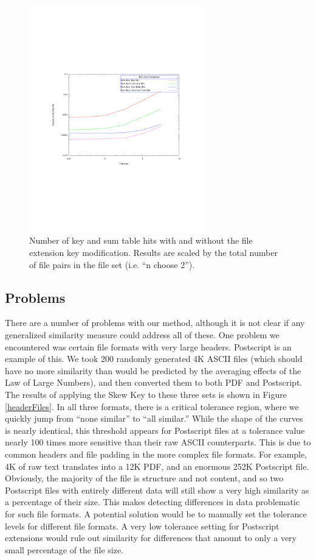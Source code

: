 \documentclass[10pt, twocolumn]{article}
\begin{document}
 \begin{figure}[t] 
 \centering
\includegraphics[width= 3in]{PairwiseElim.pdf}
\caption{Number of key and sum table hits with and without the file extension key modification.  Results are scaled by the total number of file pairs in the file set (i.e. ``n choose 2'').  }
\label{PairwiseSavings} 
\end{figure}


\subsection{Problems}

There are a number of problems with our method, although it is not clear if any  generalized similarity measure could address all of these.  One problem we encountered was certain file formats with very large headers.  Postscript is an example of this.  We took 200 randomly generated 4K ASCII files (which should have no more similarity than would be predicted by the averaging effects of the Law of Large Numbers), and then converted them to both PDF and Postscript.  The results of applying the Skew Key to these three sets is shown in Figure \ref{headerFiles}.  In all three formats, there is a critical tolerance region, where we quickly jump from ``none similar'' to ``all similar.''  While the shape of the curves is nearly identical, this threshold appears for Postscript files at a tolerance value nearly 100 times more sensitive than their raw ASCII counterparts.  This is due to common headers and file padding in the more complex file formats.  For example, 4K of raw text translates into a 12K PDF, and an enormous 252K Postscript file.  Obviously, the majority of the file is structure and not content, and so two Postscript files with entirely different data will still show a very high similarity as a percentage of their size.  This makes detecting differences in data problematic for such file formats.  A potential solution would be to manually set the tolerance levels for different file formats.  A very low tolerance setting for Postscript extensions would rule out similarity for differences that amount to only a very small percentage of the file size.
\end{document}
